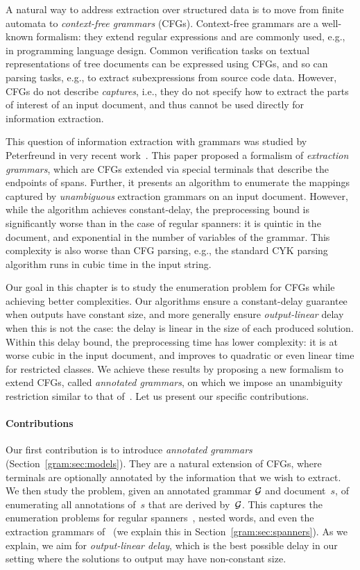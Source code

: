 
A natural way to address extraction over structured data is to move from finite automata to \emph{context-free grammars}
(CFGs). Context-free grammars are a well-known formalism: they extend regular
expressions and are commonly used, e.g., in programming language
design. Common verification tasks on textual representations of tree
documents can be expressed using CFGs, and so can parsing tasks, e.g.,
to extract subexpressions from source code data. However, CFGs do not
describe \emph{captures}, i.e., they do not specify how to extract the
parts of interest of an input document, and thus cannot be used
directly for information extraction.

%
%

This question of information extraction with grammars was studied by Peterfreund in very recent work~\cite{Peterfreund21}. This paper proposed a formalism of \emph{extraction grammars}, which are CFGs extended via special terminals that describe the endpoints of spans.
Further, it presents an algorithm to enumerate the mappings captured by
\emph{unambiguous} extraction grammars on an input document.
However, while the algorithm achieves constant-delay, the preprocessing bound is significantly worse than in the case of regular spanners: it is quintic in the document, and exponential in the number of variables of the grammar. This complexity is also worse than CFG parsing, e.g., the standard CYK parsing algorithm runs in cubic time in the input string.

%
%
%

Our goal in this chapter is to study the enumeration problem for CFGs while
achieving better complexities. Our algorithms ensure a constant-delay
guarantee when outputs have constant size, and more generally ensure
\emph{output-linear} delay when this is not the case: the delay is linear in the
size of each produced solution. Within this delay bound, the preprocessing
time has lower complexity: it is at worse cubic in the
input document, and improves to quadratic or even linear time for restricted
classes. We achieve these results by proposing a new formalism to extend CFGs, called
\emph{annotated grammars}, on which we impose an unambiguity restriction similar
to that of~\cite{Peterfreund21}. Let us present our specific contributions.

\paragraph{Contributions}
Our first contribution is to introduce \emph{annotated grammars} (Section~\ref{gram:sec:models}).
They are a natural extension of CFGs, where terminals are optionally annotated by the information that we wish to extract.
We then study the problem, given an annotated grammar $\mathcal{G}$ and document~$s$, of
enumerating all annotations of~$s$ that are derived by~$\mathcal{G}$.
This captures the enumeration problems for regular spanners~\cite{FlorenzanoRUVV18,amarilli2020constant}, nested words,
and
even the extraction grammars of~\cite{Peterfreund21} (we explain this in Section~\ref{gram:sec:spanners}). 
%
%
As we explain, we aim for \emph{output-linear delay}, which is the best
possible delay in our setting where the solutions to output may have
non-constant size. 

